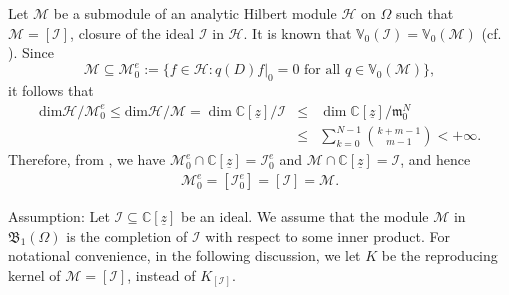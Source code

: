 \documentclass[11pt]{amsart}
\theoremstyle{definition}
\numberwithin{equation}{section}
\begin{document}
Let $\mathcal M$ be a submodule of an analytic Hilbert module $\mathcal H$ on $\Omega$ such that $\mathcal M = [\mathcal I]$, closure of the ideal $\mathcal I$ in $\mathcal H.$ It is known that $\mathbb V_0(\mathcal I)= \mathbb V_0(\mathcal M)$ (cf. \cite{bmp, dpsy}). Since 
$$
\mathcal M\subseteq\mathcal M_0^e:=\{f\in\mathcal H: q(D)f|_0=0 \mbox{~for~all~}q\in\mathbb V_0(\mathcal M)\},
$$ 
it follows that 
\begin{eqnarray*}
\mbox{dim}\mathcal H/\mathcal M_0^e\leq\mbox{dim}\mathcal
H/\mathcal M = \dim {{\mathbb C}}[\underline{z}]/\mathcal I &\leq& \dim {{\mathbb C}}[\underline{z}]/\mathfrak m_0^N\\ &\leq& \sum_{k=0}^{N-1}\binom{k+m-1}{m-1} <+\infty.
\end{eqnarray*}
Therefore,  from \cite{dpsy}, we have $\mathcal M_0^e\cap{{\mathbb C}}[\underline z]=\mathcal I_0^e$ and $\mathcal M\cap{{\mathbb C}}[\underline z]=\mathcal I$,  and hence \begin{eqnarray} \label{obs1} \mathcal
M_0^e=[\mathcal I_0^e]=[\mathcal I]=\mathcal M. \end{eqnarray}

\noindent\textsf{Assumption}: Let $\mathcal I \subseteq {{\mathbb C}}[\underline z]$ be an ideal. We assume that the module  $\mathcal M$ in $\mathfrak B_1(\Omega)$ is the completion of $\mathcal I$ with respect to some inner product. For notational convenience, in the following discussion, we let $K$ be the reproducing kernel of $\mathcal M = [\mathcal I]$, instead of $K_{[\mathcal I]}$.
\end{document}
